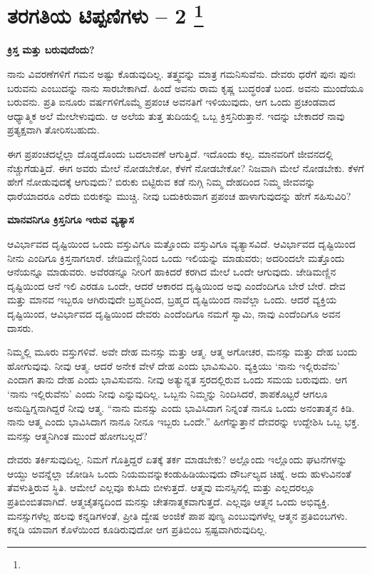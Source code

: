 
\chapter[ತರಗತಿಯ ಟಿಪ್ಪಣಿಗಳು – 2 ]{ತರಗತಿಯ ಟಿಪ್ಪಣಿಗಳು – 2 \protect\footnote{}}

\centerline{\textbf{ಕ್ರಿಸ್ತ ಮತ್ತು ಬರುವುದೆಂದು?}}

ನಾನು ವಿವರಣೆಗಳಿಗೆ ಗಮನ ಅಷ್ಟು ಕೊಡುವುದಿಲ್ಲ. ತತ್ತ್ವವನ್ನು ಮಾತ್ರ ಗಮನಿಸುವೆನು. ದೇವರು ಧರೆಗೆ ಪುನಃ ಪುನಃ ಬರುವನು ಎಂಬುದನ್ನು ನಾನು ಸಾರಬೇಕಾಗಿದೆ. ಹಿಂದೆ ಅವನು ರಾಮ ಕೃಷ್ಣ ಬುದ್ಧರಂತೆ ಬಂದ. ಅವನು ಮುಂದೆಯೂ ಬರುವನು. ಪ್ರತಿ ಐನೂರು ವರ್ಷಗಳಿಗೊಮ್ಮೆ ಪ್ರಪಂಚ ಅವನತಿಗೆ ಇಳಿಯುವುದು, ಆಗ ಒಂದು ಪ್ರಚಂಡವಾದ ಆಧ್ಯಾತ್ಮಿಕ ಅಲೆ ಮೇಲೇಳುವುದು. ಆ ಅಲೆಯ ತುತ್ತ ತುದಿಯಲ್ಲಿ ಒಬ್ಬ ಕ್ರಿಸ್ತನಿರುತ್ತಾನೆ. ಇದನ್ನು ಬೇಕಾದರೆ ನಾವು ಪ್ರತ್ಯಕ್ಷವಾಗಿ ತೋರಿಸಬಹುದು.

ಈಗ ಪ್ರಪಂಚದಲ್ಲೆಲ್ಲಾ ದೊಡ್ಡದೊಂದು ಬದಲಾವಣೆ ಆಗುತ್ತಿದೆ. ಇದೊಂದು ಕಲ್ಪ. ಮಾನವರಿಗೆ ಜೀವನದಲ್ಲಿ ನೆಚ್ಚುಗೆಡುತ್ತಿದೆ. ಈಗ ಅವರು ಮೇಲೆ ನೋಡಬೇಕೋ, ಕೆಳಗೆ ನೋಡಬೇಕೋ? ನಿಜವಾಗಿ ಮೇಲೆ ನೋಡಬೇಕು. ಕೆಳಗೆ ಹೇಗೆ ನೋಡುವುದಕ್ಕೆ ಆಗುವುದು? ಬಿರುಕು ಬಿಟ್ಟಿರುವ ಕಡೆ ನುಗ್ಗಿ ನಿಮ್ಮ ದೇಹದಿಂದ ನಿಮ್ಮ ಜೀವವನ್ನು ಧಾರೆಯಾದರೂ ಎರೆದು ಬಿರುಕನ್ನು ಮುಚ್ಚಿ. ನೀವು ಬದುಕಿರುವಾಗ ಪ್ರಪಂಚ ಹಾಳಾಗುವುದನ್ನು ಹೇಗೆ ಸಹಿಸುವಿರಿ?

\centerline{\textbf{ಮಾನವನಿಗೂ ಕ್ರಿಸ್ತನಿಗೂ ಇರುವ ವ್ಯತ್ಯಾಸ}}

ಆವಿರ್ಭಾವದ ದೃಷ್ಟಿಯಿಂದ ಒಂದು ವಸ್ತುವಿಗೂ ಮತ್ತೊಂದು ವಸ್ತುವಿಗೂ ವ್ಯತ್ಯಾಸವಿದೆ. ಆವಿರ್ಭಾವದ ದೃಷ್ಟಿಯಿಂದ ನೀನು ಎಂದಿಗೂ ಕ್ರಿಸ್ತನಾಗಲಾರೆ. ಜೇಡಿಮಣ್ಣಿನಿಂದ ಒಂದು ಇಲಿಯನ್ನು ಮಾಡುವರು; ಅದರಿಂದಲೇ ಮತ್ತೊಂದು ಆನೆಯನ್ನೂ ಮಾಡುವರು. ಅವೆರಡನ್ನೂ ನೀರಿಗೆ ಹಾಕಿದರೆ ಕರಗಿದ ಮೇಲೆ ಒಂದೇ ಆಗುವುದು. ಜೇಡಿಮಣ್ಣಿನ ದೃಷ್ಟಿಯಿಂದ ಆನೆ ಇಲಿ ಎರಡೂ ಒಂದೇ, ಆದರೆ ಆಕಾರದ ದೃಷ್ಟಿಯಿಂದ ಅವು ಎಂದೆಂದಿಗೂ ಬೇರೆ ಬೇರೆ. ದೇವ ಮತ್ತು ಮಾನವ ಇಬ್ಬರೂ ಆಗಿರುವುದೇ ಬ್ರಹ್ಮದಿಂದ, ಬ್ರಹ್ಮದ ದೃಷ್ಟಿಯಿಂದ ನಾವೆಲ್ಲಾ ಒಂದು. ಆದರೆ ವ್ಯಕ್ತಿಯ ದೃಷ್ಟಿಯಿಂದ, ಆವಿರ್ಭಾವದ ದೃಷ್ಟಿಯಿಂದ ದೇವರು ಎಂದೆಂದಿಗೂ ನಮಗೆ ಸ್ವಾಮಿ, ನಾವು ಎಂದೆಂದಿಗೂ ಅವನ ದಾಸರು.

ನಿಮ್ಮಲ್ಲಿ ಮೂರು ವಸ್ತುಗಳಿವೆ. ಅವೇ ದೇಹ ಮನಸ್ಸು ಮತ್ತು ಆತ್ಮ. ಆತ್ಮ ಅಗೋಚರ, ಮನಸ್ಸು ಮತ್ತು ದೇಹ ಬಂದು ಹೋಗುವುವು. ನೀವು ಆತ್ಮ. ಆದರೆ ಅನೇಕ ವೇಳೆ ದೇಹ ಎಂದು ಭಾವಿಸುವಿರಿ. ವ್ಯಕ್ತಿಯು ‘ನಾನು ಇಲ್ಲಿರುವೆನು’ ಎಂದಾಗ ತಾನು ದೇಹ ಎಂದು ಭಾವಿಸುವನು. ನೀವು ಅತ್ಯುನ್ನತ ಸ್ತರದಲ್ಲಿರುವ ಒಂದು ಸಮಯ ಬರುವುದು. ಆಗ ‘ನಾನು ಇಲ್ಲಿರುವೆನು’ ಎಂದು ನೀವು ಎನ್ನುವುದಿಲ್ಲ. ಒಬ್ಬನು ನಿಮ್ಮನ್ನು ನಿಂದಿಸಿದರೆ, ಶಾಪಕೊಟ್ಟರೆ ಆಗಲೂ ಅನುದ್ವಿಗ್ನನಾಗಿದ್ದರೆ ನೀವು ಆತ್ಮ. “ನಾನು ಮನಸ್ಸು ಎಂದು ಭಾವಿಸಿದಾಗ ನಿನ್ನಂತೆ ನಾನೂ ಒಂದು ಅನಂತಾತ್ಮನ ಕಿಡಿ. ನಾನು ಆತ್ಮ ಎಂದು ಭಾವಿಸಿದಾಗ ನಾನೂ ನೀನೂ ಇಬ್ಬರು ಒಂದೇ.” ಹೀಗೆನ್ನುತ್ತಾನೆ ದೇವರನ್ನು ಉದ್ದೇಶಿಸಿ ಒಬ್ಬ ಭಕ್ತ. ಮನಸ್ಸು ಆತ್ಮನಿಗಿಂತ ಮುಂದೆ ಹೋಗಬಲ್ಲದೆ?

ದೇವರು ತರ್ಕಿಸುವುದಿಲ್ಲ. ನಿಮಗೆ ಗೊತ್ತಿದ್ದರೆ ಏತಕ್ಕೆ ತರ್ಕ ಮಾಡಬೇಕು? ಅಲ್ಲೊಂದು ಇಲ್ಲೊಂದು ಘಟನೆಗಳನ್ನು ಆಯ್ದು ಅವನ್ನೆಲ್ಲಾ ಜೋಡಿಸಿ ಒಂದು ನಿಯಮವನ್ನು\break ಕಂಡುಹಿಡಿಯುವುದು ದೌರ್ಬಲ್ಯದ ಚಿಹ್ನೆ. ಅದು ಹುಳುವಿನಂತೆ ತೆವಳುತ್ತಿರುವ ಸ್ಥಿತಿ. ಆಮೇಲೆ ಎಲ್ಲವೂ ಕುಸಿದು ಬೀಳುತ್ತದೆ. ಆತ್ಮವು ಮನಸ್ಸಿನಲ್ಲಿ ಮತ್ತು ಎಲ್ಲದರಲ್ಲೂ ಪ್ರತಿಬಿಂಬಿತವಾಗಿದೆ. ಆತ್ಮಚೈತನ್ಯದಿಂದ ಮನಸ್ಸು ಚೇತನಾತ್ಮಕವಾಗುತ್ತದೆ. ಎಲ್ಲವೂ ಆತ್ಮನ ಒಂದು ಅಭಿವ್ಯಕ್ತಿ. ಮನಸ್ಸುಗಳೆಲ್ಲ ಹಲವು ಕನ್ನಡಿಗಳಂತೆ, ಪ್ರೀತಿ ದ್ವೇಷ ಅಂಜಿಕೆ ಪಾಪ ಪುಣ್ಯ ಎಂಬುವುಗಳೆಲ್ಲ ಆತ್ಮನ ಪ್ರತಿಬಿಂಬಗಳು. ಕನ್ನಡಿ ಯಾವಾಗ ಕೊಳೆಯಿಂದ ಕೂಡಿರುವುದೋ ಆಗ ಪ್ರತಿಬಿಂಬ ಸ್ಪಷ್ಟವಾಗಿರುವುದಿಲ್ಲ.


